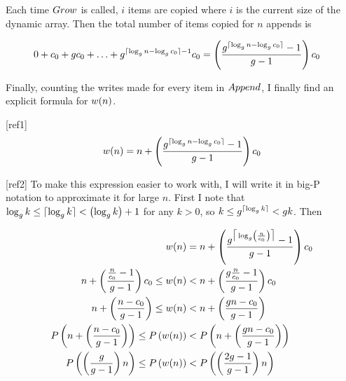Each time $Grow$ is called, $i$ items are copied where $i$ is the current size of the dynamic array. Then the total number of items copied for $n$ appends is

\begin{align*}
0 + c_0 + gc_0 + \ldots + g^{\lceil \log_{g} n - \log_{g} c_0 \rceil - 1}c_0 &= \left( \frac{g^{\lceil \log_{g} n - \log_{g} c_0 \rceil} - 1}{g - 1} \right) c_0
\end{align*}

Finally, counting the writes made for every item in $Append$, I finally find an explicit formula for $w(n)$.

[ref1]
$$
w(n) = n + \left( \frac{g^{\lceil \log_{g} n - \log_{g} c_0 \rceil} - 1}{g - 1} \right) c_0
$$

[ref2]
To make this expression easier to work with, I will write it in big-P notation to approximate it for large $n$. First I note that $\log_{g} k \leq \lceil \log_{g} k \rceil < \left( \log_{g} k \right) + 1$ for any $k > 0$, so $k \leq g^{\lceil \log_{g} k \rceil} < g{k}$. Then

\begin{align*}
w(n) &= n + \left( \frac{g^{\big\lceil \log_{g} \left( \frac {n} {c_0} \right) \big\rceil} - 1}{g - 1} \right) c_0\\
n + \left( \frac{\frac{n}{c_0} - 1}{g - 1} \right) c_0 \leq w(n) &< n + \left( \frac{g\frac{n}{c_0} - 1}{g - 1} \right) c_0\\
n + \left( \frac{n - c_0}{g - 1} \right) \leq w(n) &< n + \left( \frac{g{n} - c_0}{g - 1} \right)\\
P\left( n + \left( \frac{n - c_0}{g - 1} \right) \right) \leq P\left( w(n) \right) &< P\left( n + \left( \frac{g{n} - c_0}{g - 1} \right) \right)\\
P\left( \left( \frac{g}{g - 1} \right) n \right) \leq P\left( w(n) \right) &< P\left( \left( \frac{2g - 1}{g - 1} \right) n \right)
\end{align*}

